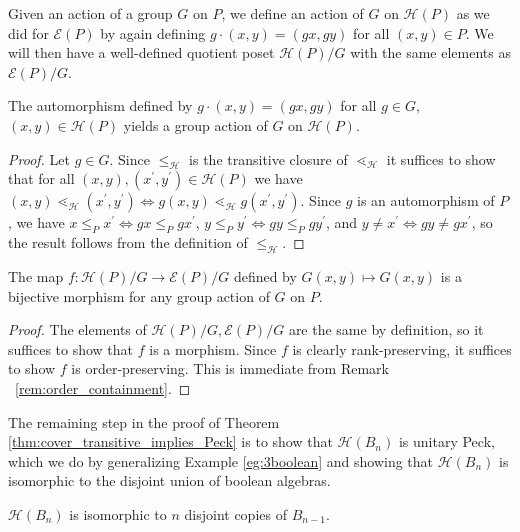 \documentclass[smallextended, envcountsame, numbook]{svjour3}
\numberwithin{equation}{section}
\renewcommand{\iff}{\Leftrightarrow}
\begin{document}
Given an action of a group $G$ on $P$, we define an action of $G$ on $\mathcal{H}(P)$ as we did for $\mathcal{E}(P)$ by again defining $g\cdot (x,y) = (gx,gy)$ for all $(x,y)\in P$.  We will then have a well-defined quotient poset $\mathcal{H}(P)/G$ with the same elements as $\mathcal{E}(P)/G$.


\begin{lemma}
\label{lem:G_action_on_HP}
The automorphism defined by $g\cdot (x, y)= (gx, gy)$ for all $g\in G$, $(x, y)\in \mathcal{H}(P)$ yields a group action of $G$ on $\mathcal{H}(P)$.
\end{lemma}

\begin{proof}
Let $g\in G$.  Since $\le_{\mathcal{H}}$ is the transitive closure of $\lessdot_{\mathcal{H}}$ it suffices to show that for all $(x,y),(x^\prime,y^\prime)\in \mathcal{H}(P)$ we have $(x, y) \lessdot_{\mathcal H} (x^\prime,y^\prime) \iff g(x, y) \lessdot_{\mathcal H} g(x^\prime, y^\prime)$.  Since $g$ is an automorphism of $P$, we have $x\le_P x^\prime \iff gx\le_P gx^\prime$, $y\le_P y^\prime \iff gy\le_P gy^\prime$, and $y\neq x^\prime \iff gy\neq gx^\prime$, so the result follows from the definition of $\le_{\mathcal{H}}$.
\end{proof}

\begin{lemma}
\label{lem:bijection_h_f}
The map $f\colon\mathcal H(P)/G \rightarrow \mathcal E(P)/G$ defined by $G(x,y) \mapsto G(x,y)$ is a bijective morphism for any group action of $G$ on $P$.
\end{lemma}

\begin{proof}
The elements of $\mathcal H(P)/G,\mathcal E(P)/G$ are the same by definition, so it suffices to show that $f$ is a morphism. Since $f$ is clearly rank-preserving, it suffices to show $f$ is order-preserving. This is immediate from Remark ~\ref{rem:order_containment}.
\end{proof}

The remaining step in the proof of Theorem \ref{thm:cover_transitive_implies_Peck} is to show that $\mathcal{H}(B_n)$ is unitary Peck, which we do by generalizing Example \ref{eg:3boolean} and showing that $\mathcal{H}(B_n)$ is isomorphic to the disjoint union of boolean algebras.

\begin{proposition}\label{prop:computing_HBn}
$\mathcal{H}(B_n)$ is isomorphic to $n$ disjoint copies of $B_{n-1}$.
\end{proposition}
\end{document}
